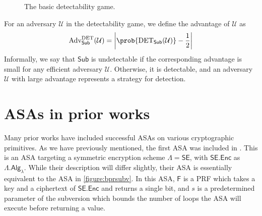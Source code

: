 \begin{figure}
\centering
\begin{pchstack}
\pchspace
{}
\end{pchstack}
\caption[The basic detectability game]{The basic detectability game.}
\label{game:detect}
\end{figure}

For an adversary $\mathcal{U}$ in the detectability game, we define the advantage of $\mathcal{U}$ as
\[
\text{Adv}^\mathrm{DET}_\mathsf{Sub}(\mathcal{U})=\left\lvert \prob{\text{DET}_\mathsf{Sub}(\mathcal{U})}-\frac{1}{2} \right\rvert
\]
Informally, we say that $\mathsf{Sub}$ is undetectable if the corresponding advantage is small for any efficient adversary $\mathcal{U}$. Otherwise, it is detectable, and an adversary $\mathcal{U}$ with large advantage represents a strategy for detection.

\section{ASAs in prior works}

Many prior works have included successful ASAs on various cryptographic primitives. As we have previously mentioned, the first ASA was included in \cite{C:BelPatRog14}. This is an ASA targeting a symmetric encryption scheme $\mathsf{\Lambda}=\mathsf{SE}$, with $\mathsf{SE.Enc}$ as $\mathsf{\Lambda.Alg}_\lambda$. While their description will differ slightly, their ASA is essentially equivalent to the ASA in \autoref{figure:bprsubv}. In this ASA, $\mathsf{F}$ is a PRF which takes a key and a ciphertext of $\mathsf{SE.Enc}$ and returns a single bit, and $s$ is a predetermined parameter of the subversion which bounds the number of loops the ASA will execute before returning a value.

